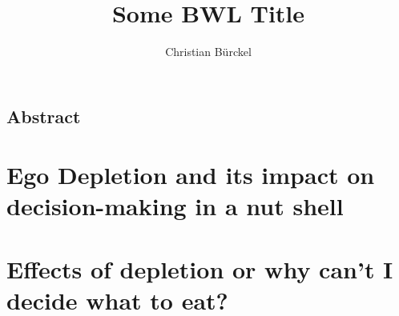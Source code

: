 
\author{Christian Bürckel}
\title{Some BWL Title}




\maketitle
%
 \thispagestyle{plain} %
 \clearpage
 \thispagestyle{empty}
 \mbox{}
 \clearpage
 \pagestyle{bib} %
 \tableofcontents
 \clearpage
 \pagestyle{abstract}
 \section*{Abstract}
  
 \clearpage
 \pagestyle{main}
 \chapter{Ego Depletion and its impact on decision-making in a nut shell}
  
 \chapter{Effects of depletion or why can't I decide what to eat?}
  
%
\clearpage
\pagestyle{bib}
%
%

